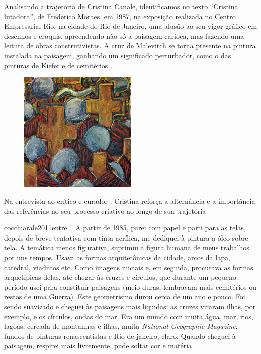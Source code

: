 Analisando a trajetória de Cristina Canale, identificamos no texto
\enquote{Cristina lutadora}, de Frederico Moraes, em 1987, na exposição
realizada no Centro Empresarial Rio, na cidade do Rio de Janeiro, uma
alusão ao seu vigor gráfico em desenhos e croquis, apreendendo não só a
paisagem carioca, mas fazendo uma leitura de obras construtivistas. A
cruz de Malevitch se torna presente na pintura instalada na paisagem,
ganhando um significado perturbador, como o das pinturas de Kiefer e de
cemitérios \parencite{demoraes1987cristina}.

\begin{figure}
	\caption{}
	\includegraphics[width=2.22414in,height=2.27465in]{figuras/canale-sobreviventes-1985.pdf.compressed.pdf}

\end{figure}

Na entrevista ao crítico e curador \textcite{cocchiarale2011entre}, Cristina reforça
a alternância e a importância das referências no seu processo criativo
ao longo de sua trajetória

\begin{displaycquote}{cocchiarale2011entre}[.]
	A partir de 1985, parei com papel e parti para as telas, depois de breve
	tentativa com tinta acrílica, me dediquei à pintura a óleo sobre tela. A
	temática menos figurativa, suprimiu a figura humana de meus trabalhos
	por uns tempos. Usava as formas arquitetônicas da cidade, arcos da lapa,
	catedral, viadutos etc. Como imagens iniciais e, em seguida, procurava
	as formas arquetípicas delas, até chegar às cruzes e círculos, que
	durante um pequeno período usei para constituir paisagens (meio duras,
	lembravam mais cemitérios ou restos de uma Guerra). Este geometrismo
	durou cerca de um ano e pouco. Foi sendo suavizado e cheguei às
	paisagens mais liquidas: as cruzes viraram ilhas, por exemplo, e os
	círculos, ondas do mar. Era um mundo com muita água, mar, rios, lagoas,
	cercada de montanhas e ilhas, muita \emph{National Geographic Magazine},
	fundos de pinturas renascentistas e Rio de janeiro, claro. Quando
	cheguei à paisagem, respirei mais livremente, pude soltar cor e matéria
\end{displaycquote}

